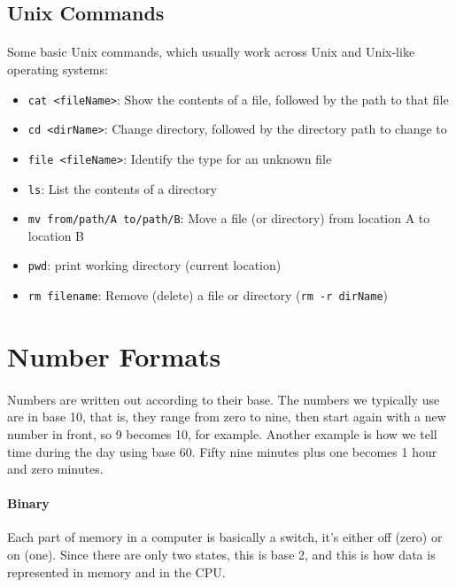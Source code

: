 \documentclass[letter,11pt]{article}
\begin{document}
\subsection{Unix Commands}
\paragraph{}Some basic Unix commands, which usually work across Unix and Unix-like operating systems:
\begin{itemize}
    \item \texttt{cat <fileName>}: Show the contents of a file, followed by the path to that file
    \item \texttt{cd <dirName>}: Change directory, followed by the directory path to change to
    \item \texttt{file <fileName>}: Identify the type for an unknown file
    \item \texttt{ls}: List the contents of a directory
    \item \texttt{mv from/path/A to/path/B}: Move a file (or directory) from location A to location B
    \item \texttt{pwd}: print working directory (current location)
    \item \texttt{rm filename}: Remove (delete) a file or directory (\texttt{rm -r dirName})
\end{itemize}

\FloatBarrier
\section{Number Formats}
\paragraph{}Numbers are written out according to their base. The numbers we typically use are in base 10, that is, they range from zero to nine, then start again with a new number in front, so 9 becomes 10, for example. Another example is how we tell time during the day using base 60. Fifty nine minutes plus one becomes 1 hour and zero minutes.

\paragraph{Binary}Each part of memory in a computer is basically a switch, it's either off (zero) or on (one). Since there are only two states, this is base 2, and this is how data is represented in memory and in the CPU.
\end{document}

